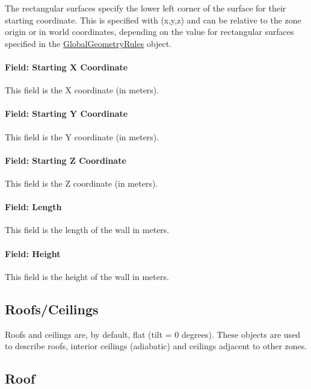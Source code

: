 The rectangular surfaces specify the lower left corner of the surface for their starting coordinate. This is specified with (x,y,z) and can be relative to the zone origin or in world coordinates, depending on the value for rectangular surfaces specified in the \hyperref[globalgeometryrules]{GlobalGeometryRules} object.

\paragraph{Field: Starting X Coordinate}\label{field-starting-x-coordinate-3}

This field is the X coordinate (in meters).

\paragraph{Field: Starting Y Coordinate}\label{field-starting-y-coordinate-3}

This field is the Y coordinate (in meters).

\paragraph{Field: Starting Z Coordinate}\label{field-starting-z-coordinate-3}

This field is the Z coordinate (in meters).

\paragraph{Field: Length}\label{field-length-3}

This field is the length of the wall in meters.

\paragraph{Field: Height}\label{field-height-3}

This field is the height of the wall in meters.

\subsection{Roofs/Ceilings}\label{roofsceilings}

Roofs and ceilings are, by default, flat (tilt = 0 degrees). These objects are used to describe roofs, interior ceilings (adiabatic) and ceilings adjacent to other zones.

\subsection{Roof}\label{roof}

